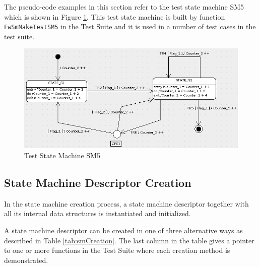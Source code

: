 \documentclass[a4paper,10pt]{article}
\begin{document}
The pseudo-code examples in this section refer to the test state machine SM5 which is shown in Figure \ref{fig:SM5}. 
This test state machine is built by function \texttt{FwSmMakeTestSM5} in the Test 
Suite and it is used in a number of test cases in the test suite.

\begin{figure}[ht]
 \centering
 \includegraphics[scale=0.52,keepaspectratio=true]{../images/SM5.png}
 \caption{Test State Machine SM5}
 \label{fig:SM5}
\end{figure}

\newpage

\subsection{State Machine Descriptor Creation} 
In the state machine creation process, a state machine descriptor together with all its internal data 
structures is instantiated and initialized.

A state machine descriptor can be created in one of three alternative ways as described in Table \ref{tab:smCreation}. 
The last column in the table gives a pointer to one or more functions in the Test Suite where each creation 
method is demonstrated.
\end{document}
